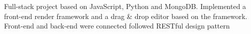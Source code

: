 \begin{cventry}
  \item Full-stack project based on JavaScript, Python and MongoDB. Implemented a front-end render framework and a drag \& drop editor based on the framework. Front-end and back-end were connected followed RESTful design pattern
\end{cventry}
